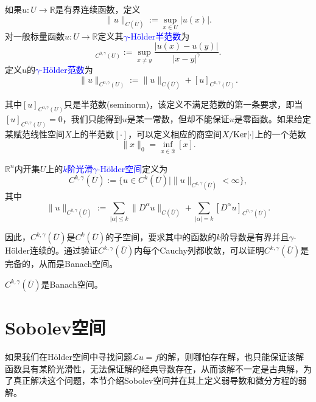 \documentclass[a4paper,10pt]{ctexart}
\begin{document}
\begin{definition}
    如果$ u:U\to\mathbb{R} $是有界连续函数，定义
    \begin{equation}
        \| u \|_{C(\overline{U})} := \sup_{x\in U} |u(x)|.
    \end{equation}
    对一般标量函数$ u:U\to \mathbb{R} $定义其\textcolor{blue}{$ \gamma $-Hölder半范数}为
    \begin{equation}
        [u]_{C^{0,\gamma}(U)} := \sup_{x\neq y} \dfrac{|u(x) - u(y)|}{|x-y|^{\gamma}}.
    \end{equation}
    定义$ u $的\textcolor{blue}{$ \gamma $-Hölder范数}为
    \begin{equation}
        \| u \|_{C^{0,\gamma}(U)} := \| u \|_{C(\overline{U})} + [u]_{C^{0,\gamma}(U)}.
    \end{equation}
\end{definition}
其中$ [u]_{C^{0,\gamma}(U)} $只是半范数(seminorm)，该定义不满足范数的第一条要求，即当$ [u]_{C^{0,\gamma}(U)} = 0 $，我们只能得到$ u $是某一常数，但却不能保证$ u $是零函数。如果给定某赋范线性空间$ X $上的半范数$ [ \cdot ] $，可以定义相应的商空间$ X / {\rm Ker}[\cdot] $上的一个范数
\[
    \| \hat{x} \|_0 = \inf_{x\in \hat{x}} [x].
\]

\begin{definition}
    $ \mathbb{R}^n $内开集$ U $上的\textcolor{blue}{$ k $阶光滑$ \gamma $-Hölder空间}定义为
    \begin{equation}
        C^{k,\gamma}(\overline{U}) := \{ u\in C^k(\overline{U}) \mid \| u \|_{C^{k,\gamma}(\overline{U})} < \infty \},
    \end{equation}
    其中
    \begin{equation}
        \| u \|_{C^{k,\gamma}(\overline{U})} := \sum_{|\alpha|\leqslant k} \| D^\alpha u \|_{C(\overline{U})} + \sum_{|\alpha| = k} [D^\alpha u]_{C^{0,\gamma}(\overline{U})}.
    \end{equation}
\end{definition}
\noindent 因此，$ C^{k,\gamma}(\overline{U}) $是$ C^k(\overline{U}) $的子空间，要求其中的函数的$ k $阶导数是有界并且$ \gamma $-Hölder连续的。通过验证$ C^{k,\gamma}(\overline{U}) $内每个Cauchy列都收敛，可以证明$ C^{k,\gamma}(\overline{U}) $是完备的，从而是Banach空间。

\begin{theorem}
    $ C^{k,\gamma}(\overline{U}) $是Banach空间。
\end{theorem}

\section{Sobolev空间}
如果我们在Hölder空间中寻找问题$ \mathcal{L}u=f $的解，则哪怕存在解，也只能保证该解函数具有某阶光滑性，无法保证解的经典导数存在，从而该解不一定是古典解，为了真正解决这个问题，本节介绍Sobolev空间并在其上定义弱导数和微分方程的弱解。
\end{document}

